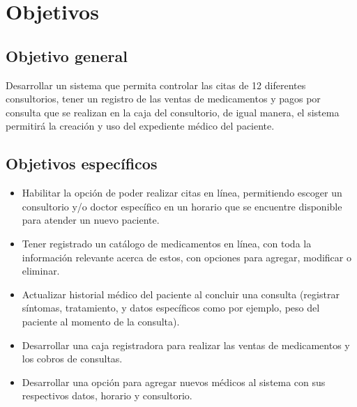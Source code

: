 \section{Objetivos}
\subsection{Objetivo general}
Desarrollar un sistema que permita controlar las citas de 12 diferentes consultorios, tener un registro de las ventas de medicamentos y pagos por consulta que se realizan en la caja del consultorio, de igual manera, el sistema permitirá la creación y uso del expediente médico del paciente.

\subsection{Objetivos específicos}

\begin{itemize}
\item Habilitar la opción de poder realizar citas en línea, permitiendo escoger un consultorio y/o doctor específico en un horario que se encuentre disponible para atender un nuevo paciente.
\item Tener registrado un catálogo de medicamentos en línea, con toda la información relevante acerca de estos, con opciones para agregar, modificar o eliminar.
\item Actualizar historial médico del paciente al concluir una consulta (registrar síntomas, tratamiento, y datos específicos como por ejemplo, peso del paciente al momento de la consulta).
\item Desarrollar una caja registradora para realizar las ventas de medicamentos y los cobros de consultas.
\item Desarrollar  una opción para agregar nuevos médicos al sistema con sus respectivos datos, horario y consultorio.

\end{itemize}




